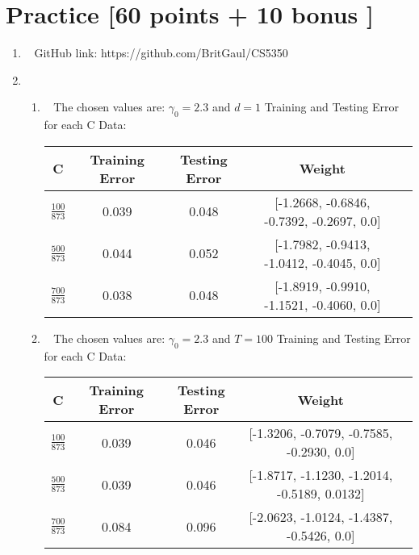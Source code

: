 \documentclass[12pt, fullpage,letterpaper]{article}
\begin{document}
\section{Practice [60 points + 10 bonus ]}
\begin{enumerate}
	\item~ 
	\newline GitHub link: https://github.com/BritGaul/CS5350  

	\item~
	\begin{enumerate}
		\item~
		\newline The chosen values are: $\gamma_0=2.3$ and $d=1$
		\newline Training and Testing Error for each C Data:
		\newline
		\begin{table}[h]
	\centering
	\begin{tabular}{c|c|c|c|c}
		C & Training Error & Testing Error & Weight\\ 
		\hline\hline
		$\frac{100}{873}$ & 0.039 & 0.048 & [-1.2668, -0.6846, -0.7392, -0.2697, 0.0] \\ \hline
		$\frac{500}{873}$ & 0.044 & 0.052 & [-1.7982, -0.9413, -1.0412, -0.4045, 0.0] \\ \hline
		$\frac{700}{873}$ & 0.038 & 0.048 & [-1.8919, -0.9910, -1.1521, -0.4060, 0.0] \\ \hline
	\end{tabular}
\end{table}
		\item~
		\newline The chosen values are: $\gamma_0=2.3$ and $T=100$
		\newline Training and Testing Error for each C Data:
		\newline
		\begin{table}[h]
	\centering
	\begin{tabular}{c|c|c|c|c}
		C & Training Error & Testing Error & Weight\\ 
		\hline\hline
		$\frac{100}{873}$ & 0.039 & 0.046 & [-1.3206, -0.7079, -0.7585, -0.2930, 0.0] \\ \hline
		$\frac{500}{873}$ & 0.039 & 0.046 & [-1.8717, -1.1230, -1.2014, -0.5189, 0.0132] \\ \hline
		$\frac{700}{873}$ & 0.084 & 0.096 & [-2.0623, -1.0124, -1.4387, -0.5426, 0.0] \\ \hline
	\end{tabular}

\end{table}
\end{enumerate}
\end{enumerate}
\end{document}
